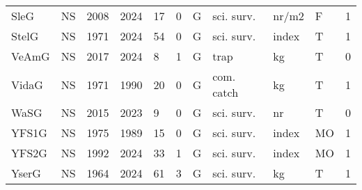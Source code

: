 \begin{table}[ht]
\begin{tabular}{p{1cm}p{1cm}p{1cm}p{1cm}p{0.8cm}p{0.8cm}p{1cm}p{2cm}p{2cm}p{1cm}p{1cm}}
  SleG & NS & 2008 & 2024 & 17 & 0 & G & sci. surv. & nr/m2 & F & 1 \\ 
  StelG & NS & 1971 & 2024 & 54 & 0 & G & sci. surv. & index & T & 1 \\ 
  VeAmG & NS & 2017 & 2024 & 8 & 1 & G & trap & kg & T & 0 \\ 
  VidaG & NS & 1971 & 1990 & 20 & 0 & G & com. catch & kg & T & 1 \\ 
  WaSG & NS & 2015 & 2023 & 9 & 0 & G & sci. surv. & nr & T & 0 \\ 
  YFS1G & NS & 1975 & 1989 & 15 & 0 & G & sci. surv. & index & MO & 1 \\ 
  YFS2G & NS & 1992 & 2024 & 33 & 1 & G & sci. surv. & index & MO & 1 \\ 
  YserG & NS & 1964 & 2024 & 61 & 3 & G & sci. surv. & kg & T & 1 \\ 
   \hline
\end{tabular}
\end{table}
